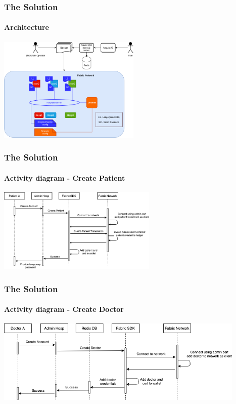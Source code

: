 \documentclass[english,hangout]{beamer}
\begin{document}
\begin{frame}[fragile]
 \frametitle{The Solution}
 \framesubtitle{Architecture}
    \begin{center}
        \vspace{-1.2em}
            \includegraphics[height=5cm]{Architecture.png}
        \end{center}
        \vspace{-3mm}
\end{frame}



\begin{frame}[fragile]
 \frametitle{The Solution}
 \framesubtitle{Activity diagram - Create Patient}
    \begin{center}
        \vspace{-1.2em}
            \includegraphics[height=4cm]{firstActivity.png}
        \end{center}
        \vspace{-3mm}
\end{frame}


\begin{frame}[fragile]
 \frametitle{The Solution}
 \framesubtitle{Activity diagram - Create Doctor}
    \begin{center}
        \vspace{-1.2em}
            \includegraphics[height=4cm]{secondActivity.png}
        \end{center}
        \vspace{-3mm}
\end{frame}
\end{document}
